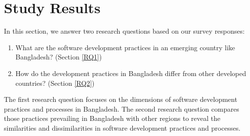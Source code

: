 \section{Study Results}
\label{study_results}
In this section, we answer two research questions based on our survey responses:
\begin{enumerate}[label=RQ\arabic{*}., leftmargin=26pt]
  \item What are the software development practices in an emerging country like Bangladesh? (Section \ref{RQ1})
  \item How do the development practices in Bangladesh differ from other developed countries? (Section \ref{RQ2})
\end{enumerate}

The first research question focuses on the dimensions of software development
practices and processes in Bangladesh. The second research question compares those
practices prevailing in Bangladesh with other regions to reveal the similarities
and dissimilarities in software development practices and processes.

